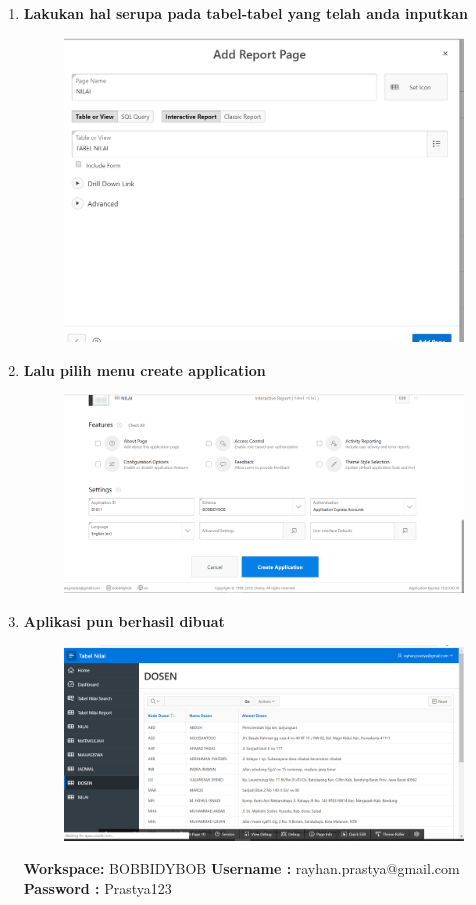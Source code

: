 \begin{enumerate}
\item \textbf{Lakukan hal serupa pada tabel-tabel yang telah anda inputkan}
\begin{figure}[H]
    \centering
    \includegraphics[scale=0.3]{figures/20.png}
    \label{18}
\end{figure}


\item \textbf{Lalu pilih menu create application}\begin{figure}[H]
    \centering
    \includegraphics[scale=0.3]{figures/21.png}
    \label{19}
\end{figure}

\item \textbf{Aplikasi pun berhasil dibuat}
\begin{figure}[H]
    \centering
    \includegraphics[scale=0.3]{figures/22.png}
    \label{28}
\end{figure}

\textbf{Workspace:} BOBBIDYBOB
\textbf{Username :} rayhan.prastya@gmail.com
\textbf{Password :} Prastya123

\end{enumerate}